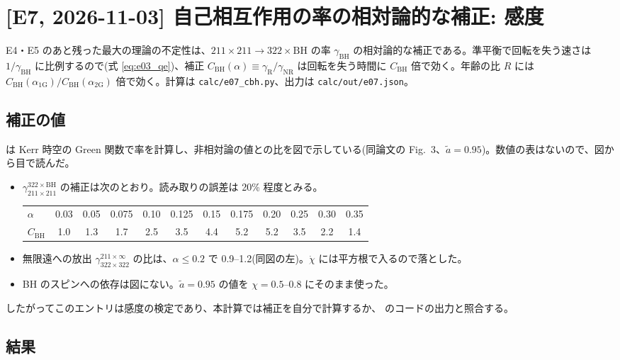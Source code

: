 \section{[E7, 2026-11-03] 自己相互作用の率の相対論的な補正: 感度}\label{sec:e07}

E4・E5 のあと残った最大の理論の不定性は、$211\times211\to322\times\mathrm{BH}$ の率 $\gamma_\mathrm{BH}$ の相対論的な補正である。準平衡で回転を失う速さは $1/\gamma_\mathrm{BH}$ に比例するので(式 \eqref{eq:e03_qe})、補正 $C_\mathrm{BH}(\alpha)\equiv\gamma_\mathrm{R}/\gamma_\mathrm{NR}$ は回転を失う時間に $C_\mathrm{BH}$ 倍で効く。年齢の比 $R$ には $C_\mathrm{BH}(\alpha_\mathrm{1G})/C_\mathrm{BH}(\alpha_\mathrm{2G})$ 倍で効く。計算は \texttt{calc/e07\_cbh.py}、出力は \texttt{calc/out/e07.json}。

\subsection{補正の値}

 は Kerr 時空の Green 関数で率を計算し、非相対論の値との比を図で示している(同論文の Fig.~3、$\tilde a=0.95$)。数値の表はないので、図から目で読んだ。
\begin{itemize}
\item $\gamma^{322\times\mathrm{BH}}_{211\times211}$ の補正は次のとおり。読み取りの誤差は 20\% 程度とみる。
  \begin{center}\small
  \begin{tabular}{@{}l*{11}{c}@{}}
  \toprule
  $\alpha$ & 0.03 & 0.05 & 0.075 & 0.10 & 0.125 & 0.15 & 0.175 & 0.20 & 0.25 & 0.30 & 0.35 \\
  $C_\mathrm{BH}$ & 1.0 & 1.3 & 1.7 & 2.5 & 3.5 & 4.4 & 5.2 & 5.2 & 3.5 & 2.2 & 1.4 \\
  \bottomrule
  \end{tabular}
  \end{center}
\item 無限遠への放出 $\gamma^{211\times\infty}_{322\times322}$ の比は、$\alpha\le0.2$ で 0.9--1.2(同図の左)。$\dot\chi$ には平方根で入るので落とした。
\item BH のスピンへの依存は図にない。$\tilde a=0.95$ の値を $\chi=0.5$--$0.8$ にそのまま使った。
\end{itemize}
したがってこのエントリは感度の検定であり、本計算では補正を自分で計算するか、 のコードの出力と照合する。

\subsection{結果}

